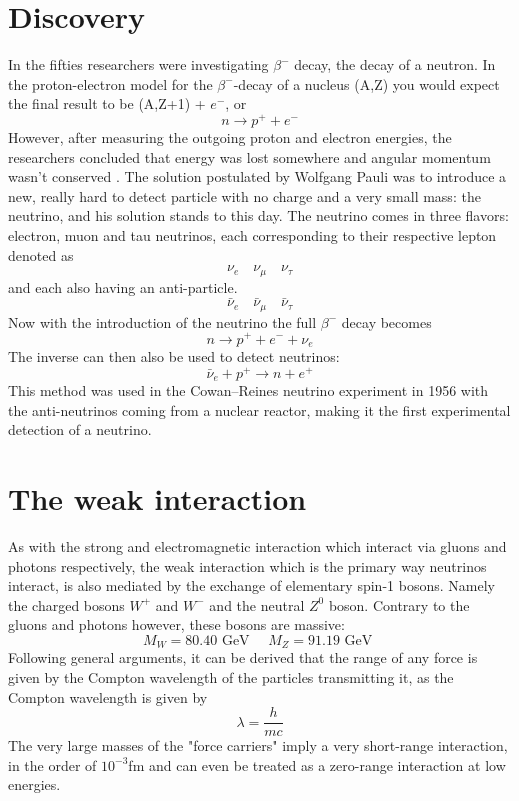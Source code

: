 \section{Discovery}
In the fifties researchers were investigating $\beta^-$ decay, the decay of a neutron. 
In the proton-electron model for the $\beta^-$-decay of a nucleus (A,Z) you would
expect the final result to be (A,Z+1) + $e^-$, or
\begin{equation}
	n \rightarrow p^+ + e^-
\end{equation}
However, after measuring the outgoing proton and electron energies, the researchers
concluded that energy was lost somewhere and angular momentum wasn't conserved
\cite{Bilenky_2012}. The solution postulated by Wolfgang Pauli was to introduce
a new, really hard to detect particle with no charge and a very small mass: the
neutrino, and his solution stands to this day.  The neutrino comes in three
flavors: electron, muon and tau neutrinos, each corresponding to their
respective lepton denoted as
\begin{equation}
	\nu_e \quad \nu_\mu \quad \nu_\tau
\end{equation}
and each also having an anti-particle.
\begin{equation}
	\bar{\nu}_e \quad \bar{\nu}_\mu \quad \bar{\nu}_\tau
\end{equation}
Now with the introduction of the neutrino the full $\beta^-$ decay
becomes
\begin{equation}
	n \rightarrow p^+ + e^- + \nu_e
\end{equation}
The inverse can then also be used to detect neutrinos:
\begin{equation}
	\bar{\nu}_e + p^+ \rightarrow n + e^+
\end{equation}
This method was used in the Cowan–Reines neutrino experiment in 1956 with the
anti-neutrinos coming from a nuclear reactor\cite{BetaCapture}, making it the
first experimental detection of a neutrino.
\section{The weak interaction}
\label{sec:WeakInt}
As with the strong and electromagnetic interaction which interact via gluons
and photons respectively, the weak interaction which is the primary way
neutrinos interact, is also mediated by the exchange of elementary spin-1
bosons.  Namely the charged bosons $W^+$ and $W^-$ and the neutral $Z^0$ boson.
Contrary to the gluons and photons however, these bosons are massive\cite{mandl2010quantum}:
\begin{equation}
  M_W = 80.40\text{ GeV }\quad M_Z = 91.19\text{ GeV }
\end{equation}
Following general arguments, it can be derived that the
range of any force is given by the Compton wavelength of the particles transmitting it\cite{martin2017particle},
as the Compton wavelength is given by 
\begin{equation}
  \lambda = \frac{h}{mc}
\end{equation}
The very large masses of the "force carriers" imply a very short-range
interaction, in the order of $10^{-3}$fm and can even be treated as a
zero-range interaction at low energies.

